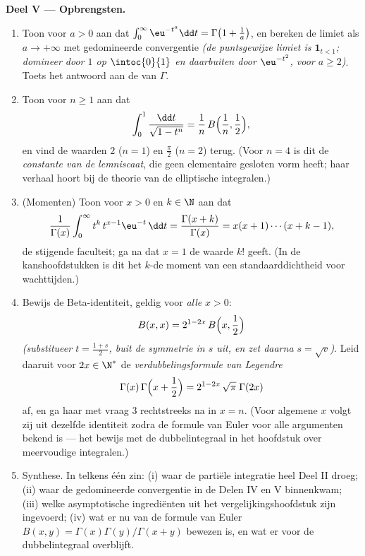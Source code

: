 \begin{problem}
\medskip
\noindent\textbf{Deel V --- Opbrengsten.}
\begin{enumerate}[resume]
  \item Toon voor $a > 0$ aan dat $\int_0^\infty \eu^{-t^a}\dd t =
        \Gamma\bigl(1 + \frac1a\bigr)$, en bereken de limiet als $a
        \to +\infty$ met gedomineerde convergentie \emph{(de
        puntsgewijze limiet is $\mathbf 1_{t < 1}$; domineer door
        $1$ op $\intoc{0}{1}$ en daarbuiten door $\eu^{-t^2}$, voor
        $a \geq 2$)}. Toets het antwoord aan de  van
        $\Gamma$.
  \item Toon voor $n \geq 1$ aan dat
        \[
        \int_0^1 \frac{\dd t}{\sqrt{1 - t^n}}
        = \frac1n\,B\Bigl(\frac1n, \frac12\Bigr),
        \]
        en vind de waarden $2$ ($n = 1$) en $\frac\pi2$ ($n = 2$)
        terug. (Voor $n = 4$ is dit de \emph{constante van de
        lemniscaat}, die geen elementaire gesloten vorm heeft; haar
        verhaal hoort bij de theorie van de elliptische
        integralen.)
  \item (Momenten) Toon voor $x > 0$ en $k \in \N$ aan dat
        \[
        \frac{1}{\Gamma(x)}\int_0^\infty
        t^{k}\,t^{x-1}\eu^{-t}\,\dd t
        = \frac{\Gamma(x+k)}{\Gamma(x)}
        = x(x+1)\cdots(x+k-1),
        \]
        de stijgende faculteit; ga na dat $x = 1$ de waarde $k!$
        geeft. (In de kanshoofdstukken is dit het $k$-de moment van
        een standaarddichtheid voor wachttijden.)
  \item Bewijs de Beta-identiteit, geldig voor \emph{alle} $x >
        0$:
        \[
        B(x, x) = 2^{1-2x}\,B\Bigl(x, \frac12\Bigr)
        \]
        \emph{(substitueer $t = \frac{1+s}2$, buit de symmetrie in
        $s$ uit, en zet daarna $s = \sqrt v$)}. Leid daaruit voor
        $2x \in \N^*$ de \emph{verdubbelingsformule van Legendre}
        \[
        \Gamma(x)\,\Gamma\Bigl(x + \frac12\Bigr)
        = 2^{1-2x}\,\sqrt\pi\;\Gamma(2x)
        \]
        af, en ga haar met vraag 3 rechtstreeks na in $x = n$.
        (Voor algemene $x$ volgt zij uit dezelfde identiteit zodra
        de formule van Euler voor alle argumenten bekend is --- het
        bewijs met de dubbelintegraal in het hoofdstuk over
        meervoudige integralen.)
  \item Synthese. In telkens één zin: (i) waar de partiële
        integratie heel Deel II droeg; (ii) waar de gedomineerde
        convergentie in de Delen IV en V binnenkwam; (iii) welke
        asymptotische ingrediënten uit het vergelijkingshoofdstuk
        zijn ingevoerd; (iv) wat er nu van de formule van Euler
        $B(x,y) = \Gamma(x)\Gamma(y)/\Gamma(x+y)$ bewezen is, en
        wat er voor de dubbelintegraal overblijft.
\end{enumerate}
\end{problem}
